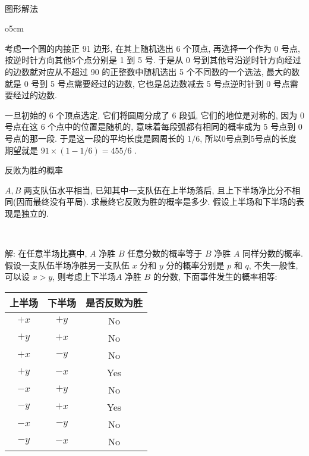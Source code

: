 ~

\noindent 图形解法

\begin{wrapfigure}{o}{5cm}
\end{wrapfigure}

考虑一个圆的内接正 91 边形, 在其上随机选出 6 个顶点, 再选择一个作为 0 号点, 按逆时针方向其他5个点分别是 1 到 5 号. 于是从 0 号到其他号沿逆时针方向经过的边数就对应从不超过 90 的正整数中随机选出 5 个不同数的一个选法, 最大的数就是 0 号到 5 号点需要经过的边数, 它也是总边数减去 5 号点逆时针到 0 号点需要经过的边数. 

一旦初始的 6 个顶点选定, 它们将圆周分成了 6 段弧, 它们的地位是对称的, 因为 0 号点在这 6 个点中的位置是随机的, 意味着每段弧都有相同的概率成为 5 号点到 0 号点的那一段. 于是这一段的平均长度是圆周长的 $1/6$, 所以0号点到5号点的长度期望就是 $91\times(1-1/6) = 455/6$ .


\newpage
\noindent 反败为胜的概率

$A,B$ 两支队伍水平相当, 已知其中一支队伍在上半场落后, 且上下半场净比分不相同(因而最终没有平局). 求最终它反败为胜的概率是多少. 假设上半场和下半场的表现是独立的.

~

解: 在任意半场比赛中, $A$ 净胜 $B$ 任意分数的概率等于 $B$ 净胜 $A$ 同样分数的概率. 假设一支队伍半场净胜另一支队伍 $x$ 分和 $y$ 分的概率分别是 $p$ 和 $q$, 不失一般性, 可以设 $x > y$, 则考虑上下半场$A$ 净胜 $B$ 的分数, 下面事件发生的概率相等:
\begin{figure*}[htbp]
\centering
\begin{tabular}{c|c|c}
\hline
上半场 & 下半场 & 是否反败为胜 \\ \hline
$+x$ & $+y$ & No \\ \hline
$+y$ & $+x$ & No \\ \hline
$+x$ & $-y$ & No \\ \hline
$+y$ & $-x$ & Yes \\ \hline
$-x$ & $+y$ & No \\ \hline
$-y$ & $+x$ & Yes \\ \hline
$-x$ & $-y$ & No \\ \hline
$-y$ & $-x$ & No \\ \hline
\end{tabular}
\end{figure*}

